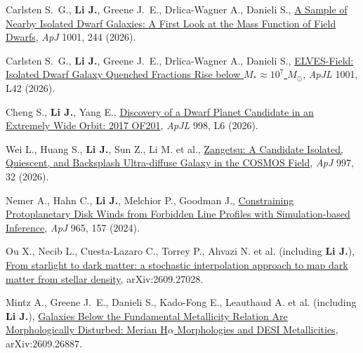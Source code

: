 
\item Carlsten S.~G., \textbf{Li J.}, Greene J.~E., Drlica-Wagner A., Danieli S., \href{https://ui.adsabs.harvard.edu/abs/2026ApJ..1001..244C}{A Sample of Nearby Isolated Dwarf Galaxies: A First Look at the Mass Function of Field Dwarfs}, \textit{ApJ} 1001, 244 (2026).

\item Carlsten S.~G., \textbf{Li J.}, Greene J.~E., Drlica-Wagner A., Danieli S., \href{https://ui.adsabs.harvard.edu/abs/2026ApJ..1001L..42C}{ELVES-Field: Isolated Dwarf Galaxy Quenched Fractions Rise below $M_* \approx 10^7$ $M_\odot$}, \textit{ApJL} 1001, L42 (2026).

\item Cheng S., \textbf{Li J.}, Yang E., \href{https://ui.adsabs.harvard.edu/abs/2026ApJ...998L...6C}{Discovery of a Dwarf Planet Candidate in an Extremely Wide Orbit: 2017 OF201}, \textit{ApJL} 998, L6 (2026).

\item Wei L., Huang S., \textbf{Li J.}, Sun Z., Li M. et al., \href{https://ui.adsabs.harvard.edu/abs/2026ApJ...997...32W}{Zangetsu: A Candidate Isolated, Quiescent, and Backsplash Ultra-diffuse Galaxy in the COSMOS Field}, \textit{ApJ} 997, 32 (2026).

\item Nemer A., Hahn C., \textbf{Li J.}, Melchior P., Goodman J., \href{https://ui.adsabs.harvard.edu/abs/2024ApJ...965..157N}{Constraining Protoplanetary Disk Winds from Forbidden Line Profiles with Simulation-based Inference}, \textit{ApJ} 965, 157 (2024).


\item Ou X., Necib L., Cuesta-Lazaro C., Torrey P., Ahvazi N. et al. (including \textbf{Li J.}), \href{https://ui.adsabs.harvard.edu/abs/2026arXiv260927028O}{From starlight to dark matter: a stochastic interpolation approach to map dark matter from stellar density}, arXiv:2609.27028.

\item Mintz A., Greene J.~E., Danieli S., Kado-Fong E., Leauthaud A. et al. (including \textbf{Li J.}), \href{https://ui.adsabs.harvard.edu/abs/2026arXiv260926887M}{Galaxies Below the Fundamental Metallicity Relation Are Morphologically Disturbed: Merian H$α$ Morphologies and DESI Metallicities}, arXiv:2609.26887.


